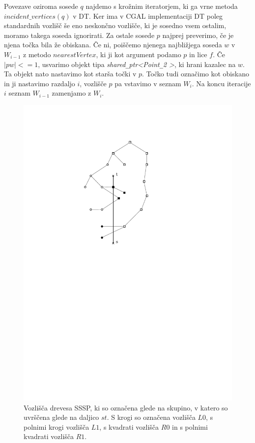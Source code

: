 \documentclass[a4paper, 12pt]{book}
\newcommand{\U}{\texttt{\_}}
\begin{document}
Povezave oziroma sosede $q$ najdemo s krožnim iteratorjem, ki ga vrne metoda $incident\U vertices(q)$ v DT. Ker ima v CGAL implementaciji DT poleg standardnih vozlišč še eno neskončno vozlišče, ki je sosedno vsem ostalim, moramo takega soseda ignorirati. Za ostale sosede $p$ najprej preverimo, če je njena točka bila že obiskana. Če ni, poiščemo njenega najbližjega soseda $w$ v $W_{i-1}$ z metodo $nearestVertex$, ki ji kot argument podamo $p$ in lice $f$. Če $|pw| <= 1$, usvarimo objekt tipa \textit{shared\U ptr\textless Point\U 2 \textgreater}, ki hrani kazalec na $w$. Ta objekt nato nastavimo kot starša točki v $p$. Točko tudi označimo kot obiskano in ji nastavimo razdaljo $i$, vozlišče $p$ pa vstavimo v seznam $W_i$. Na koncu iteracije $i$ seznam $W_{i-1}$ zamenjamo z $W_i$.

\begin{figure}
\centerline{\includegraphics{pics/categorization.pdf}}
\caption{Vozlišča drevesa SSSP, ki so označena glede na skupino, v katero so uvrščena glede na daljico $st$. S krogi so označena vozlišča $L0$, s polnimi krogi vozlišča $L1$, s kvadrati vozlišča $R0$ in s polnimi kvadrati vozlišča $R1$. }
\label{categorization}
\end{figure}
\end{document}
